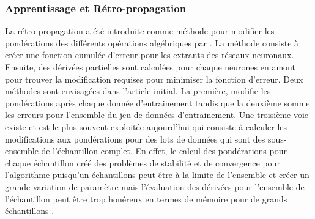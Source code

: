     \subsubsection{Apprentissage et Rétro-propagation}
      La rétro-propagation a été introduite comme méthode pour modifier les pondérations des différents opérations algébriques par \textcite{rumelhart_learning_1986}. La méthode consiste à créer une fonction cumulée d'erreur pour les extrants des réseaux neuronaux. Ensuite, des dérivées partielles sont calculées pour chaque neurones en amont pour trouver la modification requises pour minimiser la fonction d'erreur. Deux méthodes sont envisagées dans l'article initial. La première, modifie les pondérations après chaque donnée d'entrainement tandis que la deuxième somme les erreurs pour l'ensemble du jeu de données d'entrainement. Une troisième voie existe et est le plus souvent exploitée aujourd'hui qui consiste à calculer les modifications aux pondérations pour des lots de données qui sont des sous-ensemble de l'échantillon complet. En effet, le calcul des pondérations pour chaque échantillon créé des problèmes de stabilité et de convergence pour l'algorithme puisqu'un échantillons peut être à la limite de l'ensemble et créer un grande variation de paramètre mais l'évaluation des dérivées pour l'ensemble de l'échantillon peut être trop honéreux en termes de mémoire pour de grands échantillons \parencite{wallach_deep_2024}.\par
      
